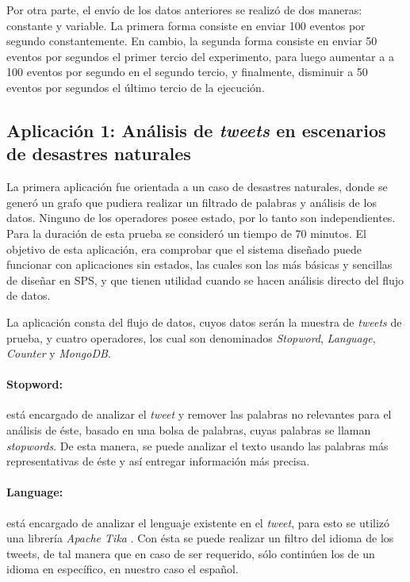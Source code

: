 Por otra parte, el envío de los datos anteriores se realizó de dos maneras: constante y variable. La primera forma consiste en enviar 100 eventos por segundo constantemente. En cambio, la segunda forma consiste en enviar 50 eventos por segundos el primer tercio del experimento, para luego aumentar a a 100 eventos por segundo en el segundo tercio, y finalmente, disminuir a 50 eventos por segundos el último tercio de la ejecución.


\subsection{Aplicación 1: Análisis de \textit{tweets} en escenarios de desastres naturales}
La primera aplicación fue orientada a un caso de desastres naturales, donde se generó un grafo que pudiera realizar un filtrado de palabras y análisis de los datos. Ninguno de los operadores posee estado, por lo tanto son independientes. Para la duración de esta prueba se consideró un tiempo de 70 minutos. El objetivo de esta aplicación, era comprobar que el sistema diseñado puede funcionar con aplicaciones sin estados, las cuales son las más básicas y sencillas de diseñar en SPS, y que tienen utilidad cuando se hacen análisis directo del flujo de datos.

La aplicación consta del flujo de datos, cuyos datos serán la muestra de \textit{tweets} de prueba, y cuatro operadores, los cual son denominados \textit{Stopword}, \textit{Language}, \textit{Counter} y \textit{MongoDB}.

\paragraph{Stopword:} está encargado de analizar el \textit{tweet} y remover las palabras no relevantes para el análisis de éste, basado en una bolsa de palabras, cuyas palabras se llaman \textit{stopwords}. De esta manera, se puede analizar el texto usando las palabras más representativas de éste y así entregar información más precisa.

\paragraph{Language:} está encargado de analizar el lenguaje existente en el \textit{tweet}, para esto se utilizó una librería \textit{Apache Tika} \citep{mattmann2011tika}. Con ésta se puede realizar un filtro del idioma de los tweets, de tal manera que en caso de ser requerido, sólo continúen los de un idioma en específico, en nuestro caso el español.

